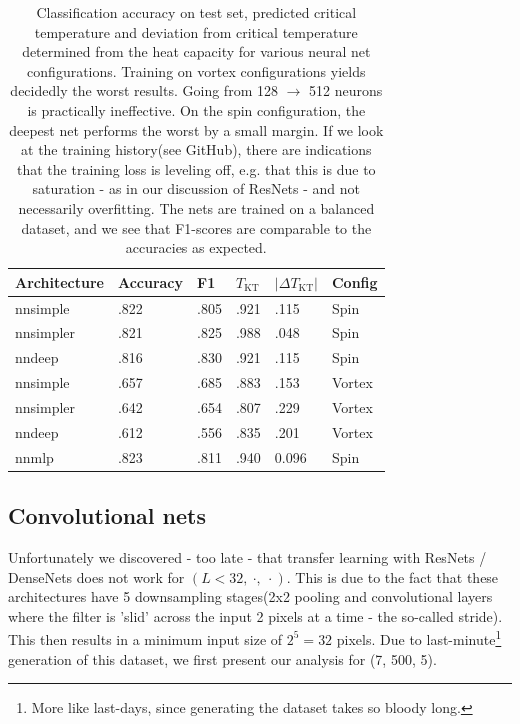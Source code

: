 \documentclass[]{article}
\begin{document}
\begin{table}[H]
	\centering
	\begin{tabular}{l|l|l|l|l|l}
		Architecture & Accuracy & F1 & $T_\text{KT}$ & $|\Delta T_\text{KT}|$ & Config \\
		\hline 
		nnsimple & .822 & .805 & .921 &  .115 & Spin  \\
		nnsimpler & .821 & .825 & .988 &  .048 & Spin \\
		nndeep & .816 & .830 & .921 &  .115 & Spin\\
		\hline
		nnsimple & .657 & .685 & .883 &  .153 & Vortex \\
		nnsimpler & .642 & .654 & .807 &  .229 & Vortex \\
		nndeep & .612 & .556 & .835 &  .201 & Vortex \\
		\hline
		nnmlp & .823 & .811 & .940 & 0.096 & Spin 
	\end{tabular}
	\caption{Classification accuracy on test set, predicted critical temperature and deviation from critical temperature determined from the heat capacity for various neural net configurations. Training on vortex configurations yields decidedly the worst results. Going from 128 $\to$ 512 neurons is practically ineffective. On the spin configuration, the deepest net performs the worst by a small margin. If we look at the training history(see GitHub), there are indications that the training loss is leveling off, e.g. that this is due to saturation - as in our discussion of ResNets - and not necessarily overfitting. The nets are trained on a balanced dataset, and we see that F1-scores are comparable to the accuracies as expected.}
	\label{tab:nn_scores}
\end{table}

\subsection{Convolutional nets}
Unfortunately we discovered - too late - that transfer learning with ResNets / DenseNets does not work for $(L < 32,\ \cdot,\ \cdot)$. This is due to the fact that these architectures have 5 downsampling stages(2x2 pooling and convolutional layers where the filter is 'slid' across the input 2 pixels at a time - the so-called stride). This then results in a minimum input size of $2^5 = 32$ pixels. Due to last-minute\footnote{More like last-days, since generating the dataset takes so bloody long.} generation of this dataset, we first present our analysis for (7, 500, 5).
\end{document}
